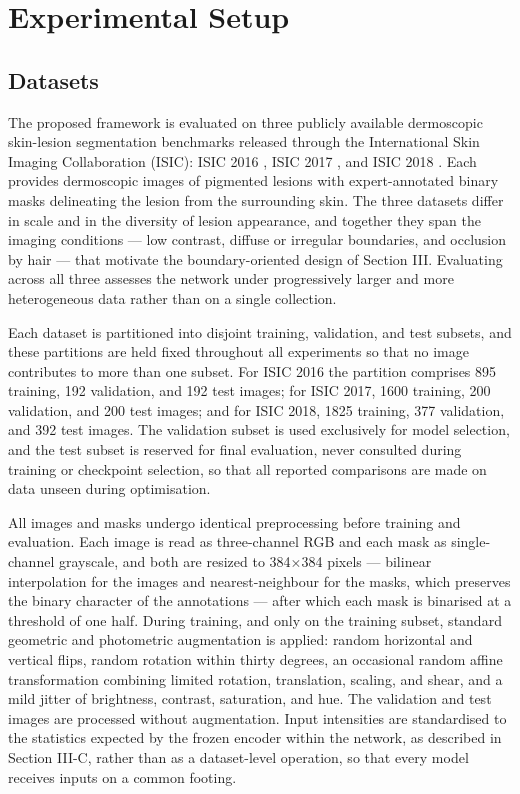\section{Experimental Setup}
\label{sec:exp}

\subsection{Datasets}

The proposed framework is evaluated on three publicly available dermoscopic skin-lesion segmentation benchmarks released through the International Skin Imaging Collaboration (ISIC): ISIC 2016 \cite{ref20}, ISIC 2017 \cite{ref21}, and ISIC 2018 \cite{ref22}. Each provides dermoscopic images of pigmented lesions with expert-annotated binary masks delineating the lesion from the surrounding skin. The three datasets differ in scale and in the diversity of lesion appearance, and together they span the imaging conditions --- low contrast, diffuse or irregular boundaries, and occlusion by hair --- that motivate the boundary-oriented design of Section III. Evaluating across all three assesses the network under progressively larger and more heterogeneous data rather than on a single collection.

Each dataset is partitioned into disjoint training, validation, and test subsets, and these partitions are held fixed throughout all experiments so that no image contributes to more than one subset. For ISIC 2016 the partition comprises 895 training, 192 validation, and 192 test images; for ISIC 2017, 1600 training, 200 validation, and 200 test images; and for ISIC 2018, 1825 training, 377 validation, and 392 test images. The validation subset is used exclusively for model selection, and the test subset is reserved for final evaluation, never consulted during training or checkpoint selection, so that all reported comparisons are made on data unseen during optimisation.

All images and masks undergo identical preprocessing before training and evaluation. Each image is read as three-channel RGB and each mask as single-channel grayscale, and both are resized to 384$\times$384 pixels --- bilinear interpolation for the images and nearest-neighbour for the masks, which preserves the binary character of the annotations --- after which each mask is binarised at a threshold of one half. During training, and only on the training subset, standard geometric and photometric augmentation is applied: random horizontal and vertical flips, random rotation within thirty degrees, an occasional random affine transformation combining limited rotation, translation, scaling, and shear, and a mild jitter of brightness, contrast, saturation, and hue. The validation and test images are processed without augmentation. Input intensities are standardised to the statistics expected by the frozen encoder within the network, as described in Section III-C, rather than as a dataset-level operation, so that every model receives inputs on a common footing.


